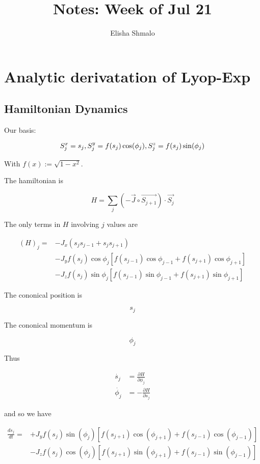 \documentclass{article}
\author{Elisha Shmalo}
\title{Notes: Week of Jul 21}
\begin{document}
\maketitle

\section{Analytic derivatation of Lyop-Exp}

\subsection{Hamiltonian Dynamics}

Our basis:

\[
S_j^x = s_j, \space S_j^y = f(s_j)\cos(\phi_j), \space S_j^z = f(s_j)\sin(\phi_j)
\]

With $f(x) := \sqrt{1 - x^2}$.

The hamiltonian is

\[
H = \sum_j (-\vec{J} \circ \vec{S_{j+1}}) \cdot \vec{S_j}
\]

The only terms in $H$ involving $j$ values are

\begin{align*}
    (H)_j = &-J_x(s_js_{j-1} + s_js_{j+1}) \\
            &-J_yf(s_j)\cos\phi_j[f(s_{j-1})\cos\phi_{j-1} + f(s_{j+1})\cos\phi_{j+1}] \\
            &-J_zf(s_j)\sin\phi_j[f(s_{j-1})\sin\phi_{j-1} + f(s_{j+1})\sin\phi_{j+1}]
\end{align*}

The cononical position is

\[s_j\]

The cononical momentum is

\[\phi_j\]

Thus

\begin{align*}
    \dot{s_j} &= \frac{\partial H}{\partial \phi_j}\\
    \dot{\phi_j} &= -\frac{\partial H}{\partial s_j}
\end{align*}

and so we have

\begin{align*}
    \frac{ds_j}{dt} = &+J_yf(s_j)\sin(\phi_j)[f(s_{j+1})\cos(\phi_{j+1}) + f(s_{j-1})\cos(\phi_{j-1})] \\
                      &-J_zf(s_j)\cos(\phi_j)[f(s_{j+1})\sin(\phi_{j+1}) + f(s_{j-1})\sin(\phi_{j-1})]
\end{align*}
\end{document}
